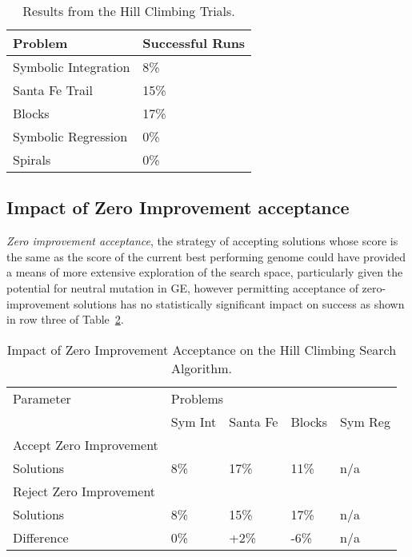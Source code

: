 \begin{table}[h]
\begin{center}
\begin{tabular}{|l|l|}
\hline
Problem & Successful Runs \\
\hline
Symbolic Integration & 8\% \\
Santa Fe Trail & 15\% \\
Blocks & 17\% \\
Symbolic Regression & 0\% \\
Spirals & 0\% \\
\hline
\end{tabular}
\caption{ \label{hc_results_table} Results from the Hill Climbing Trials.}
\end{center}
\end{table}


\subsection{Impact of Zero Improvement acceptance}

\emph{Zero improvement acceptance}, the strategy of accepting solutions whose score is the same as the score of the current best performing genome could have provided a means of more extensive exploration of the search space, particularly given the potential for neutral mutation in GE, however permitting acceptance of zero-improvement solutions has no statistically significant impact on success as shown in row three of Table~\ref{zia_table}.   

\begin{table}[h]
\begin{center}
\begin{tabular}{|l|l|l|l|l|}
\hline
Parameter &\multicolumn{4}{l|}{Problems}\\
\cline{2-1} \cline{3-1} \cline{4-1} \cline{5-1} 
 & Sym Int & Santa Fe & Blocks & Sym Reg \\
\hline
Accept Zero Improvement & & & & \\
Solutions & 8\% & 17\% & 11\% & n/a \\
Reject Zero Improvement & & & &  \\
Solutions  & 8\% & 15\% & 17\% & n/a  \\
\hline
Difference & 0\% & +2\% & -6\% & n/a  \\
\hline
\end{tabular}
\caption{\label{zia_table}Impact of Zero Improvement Acceptance on the Hill Climbing Search Algorithm.}
\end{center}
\end{table}


